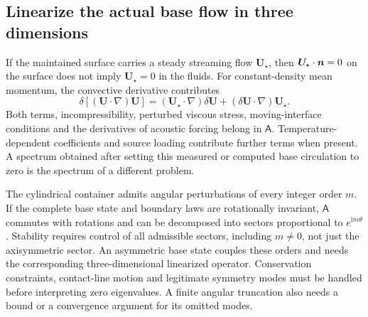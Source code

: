 \subsection{Linearize the actual base flow in three dimensions}
If the maintained surface carries a steady streaming flow $\bm U_\star$,
then $\bm U_\star\cdot\bm n=0$ on the surface does not imply
$\bm U_\star=0$ in the fluids. For constant-density mean momentum, the
convective derivative contributes
\begin{equation}
 \delta[(\bm U\cdot\nabla)\bm U]
   =(\bm U_\star\cdot\nabla)\delta\bm U
     +(\delta\bm U\cdot\nabla)\bm U_\star.
 \label{eq:streaming-linearization}
\end{equation}
Both terms, incompressibility, perturbed viscous stress, moving-interface
conditions and the derivatives of acoustic forcing belong in $\mathsf A$.
Temperature-dependent coefficients and source loading contribute further
terms when present. A spectrum obtained after setting this measured or
computed base circulation to zero is the spectrum of a different problem.

The cylindrical container admits angular perturbations of every integer order
$m$. If the complete base state and boundary laws are rotationally invariant,
$\mathsf A$ commutes with rotations and can be decomposed into sectors
proportional to $e^{\mathrm i m\theta}$. Stability requires control of all
admissible sectors, including $m\ne0$, not just the axisymmetric sector.
An asymmetric base state couples these orders and needs the corresponding
three-dimensional linearized operator. Conservation constraints, contact-line
motion and legitimate symmetry modes must be handled before interpreting
zero eigenvalues. A finite angular truncation also needs a bound or a
convergence argument for its omitted modes.

